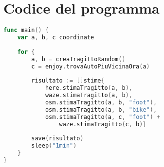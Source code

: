 \section{Codice del programma}

\begin{lstlisting}[language=Go]
func main() {
	var a, b, c coordinate
	
	for {
		a, b = creaTragittoRandom()
		c = enjoy.trovaAutoPiuVicinaOra(a)
		
		risultato := []stime{
			here.stimaTragitto(a, b),
			waze.stimaTragitto(a, b),
			osm.stimaTragitto(a, b, "foot"),
			osm.stimaTragitto(a, b, "bike"),
			osm.stimaTragitto(a, c, "foot") +
				waze.stimaTragitto(c, b)}
		
		save(risultato)
		sleep("1min")
	}
}
\end{lstlisting}